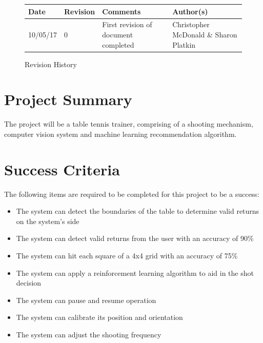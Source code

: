 \documentclass[11pt]{article}
\begin{document}
\tableofcontents
\listoffigures

\vfill
\begin{figure}[htbp]
   \centering
   \noindent\begin{tabularx}{\textwidth}{|l|l|X|l|}
   \hline 
   \textbf{Date} & \textbf{Revision} & \textbf{Comments} & \textbf{Author(s)} \\
   \hline 
   10/05/17 & 0 & First revision of document completed & Christopher McDonald \& Sharon Platkin \\
   \hline
   \end{tabularx}
   \caption{Revision History}
\end{figure}

\newpage

\section{Project Summary}
The project will be a table tennis trainer, comprising of a shooting mechanism, computer vision system and machine learning recommendation algorithm.
\section{Success Criteria}
The following items are required to be completed for this project to be a success:
\begin{itemize}
\item The system can detect the boundaries of the table to determine valid returns on the system's side
\item The system can detect valid returns from the user with an accuracy of 90\%
\item The system can hit each square of a 4x4 grid with an accuracy of 75\%
\item The system can apply a reinforcement learning algorithm to aid in the shot decision
\item The system can pause and resume operation
\item The system can calibrate its position and orientation
\item The system can adjust the shooting frequency
\end{itemize}
\end{document}
